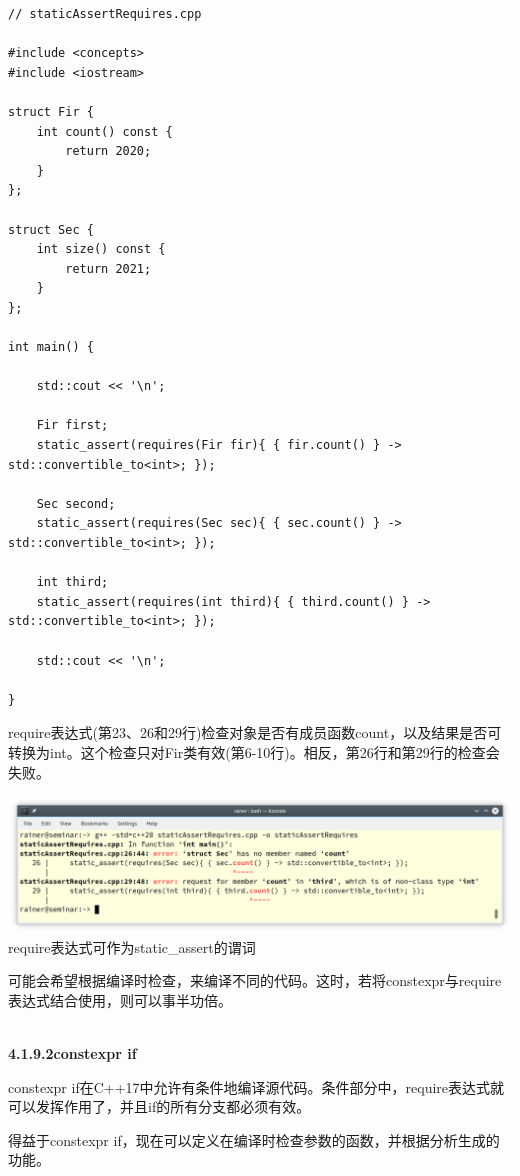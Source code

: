 \begin{lstlisting}[style=styleCXX]
// staticAssertRequires.cpp

#include <concepts>
#include <iostream>

struct Fir {
	int count() const {
		return 2020;
	}
};

struct Sec {
	int size() const {
		return 2021;
	}
};

int main() {

	std::cout << '\n';
	
	Fir first;
	static_assert(requires(Fir fir){ { fir.count() } -> std::convertible_to<int>; });
	
	Sec second;
	static_assert(requires(Sec sec){ { sec.count() } -> std::convertible_to<int>; });
	
	int third;
	static_assert(requires(int third){ { third.count() } -> std::convertible_to<int>; });
	
	std::cout << '\n';

}
\end{lstlisting}

require表达式(第23、26和29行)检查对象是否有成员函数count，以及结果是否可转换为int。这个检查只对Fir类有效(第6-10行)。相反，第26行和第29行的检查会失败。

\begin{center}
\includegraphics[width=1.0\textwidth]{content/3/chapter4/images/1-9.png}\\
require表达式可作为static\_assert的谓词
\end{center}

可能会希望根据编译时检查，来编译不同的代码。这时，若将constexpr与require表达式结合使用，则可以事半功倍。

\hspace*{\fill} \\ %
\noindent
\textbf{4.1.9.2\hspace{0.2cm}constexpr if}

constexpr if在C++17中允许有条件地编译源代码。条件部分中，require表达式就可以发挥作用了，并且if的所有分支都必须有效。

得益于constexpr if，现在可以定义在编译时检查参数的函数，并根据分析生成的功能。

